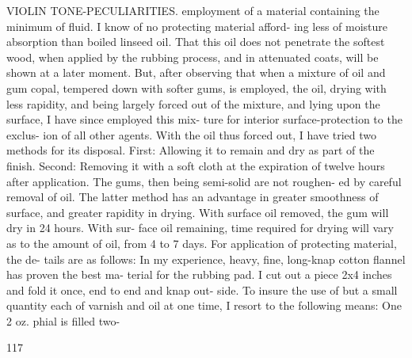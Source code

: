 \documentclass{article}
\begin{document}
VIOLIN TONE-PECULIARITIES. employment of a material containing the minimum of fluid. I know of no protecting material afford- ing less of moisture absorption than boiled linseed oil. That this oil does not penetrate the softest wood, when applied by the rubbing process, and in attenuated coats, will be shown at a later moment. But, after observing that when a mixture of oil and gum copal, tempered down with softer gums, is employed, the oil, drying with less rapidity, and being largely forced out of the mixture, and lying upon the surface, I have since employed this mix- ture for interior surface-protection to the exclus- ion of all other agents. With the oil thus forced out, I have tried two methods for its disposal. First: Allowing it to remain and dry as part of the finish. Second: Removing it with a soft cloth at the expiration of twelve hours after application. The gums, then being semi-solid are not roughen- ed by careful removal of oil. The latter method has an advantage in greater smoothness of surface, and greater rapidity in drying. With surface oil removed, the gum will dry in 24 hours. With sur- face oil remaining, time required for drying will vary as to the amount of oil, from 4 to 7 days. For application of protecting material, the de- tails are as follows: In my experience, heavy, fine, long-knap cotton flannel has proven the best ma- terial for the rubbing pad. I cut out a piece 2x4 inches and fold it once, end to end and knap out- side. To insure the use of but a small quantity each of varnish and oil at one time, I resort to the following means: One 2 oz. phial is filled two-

117
\end{document}
